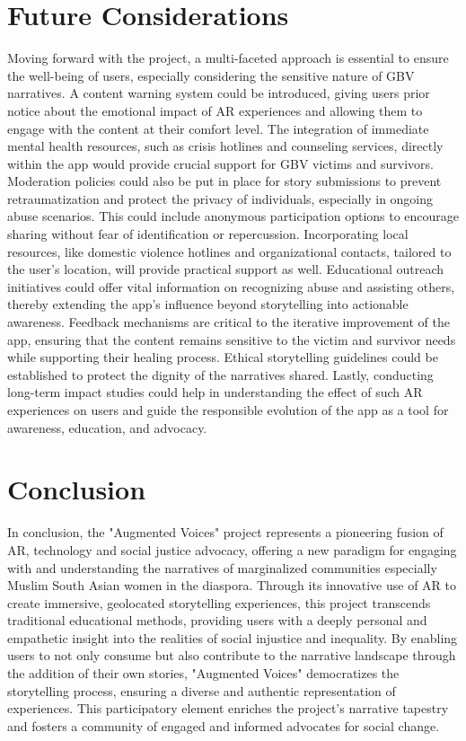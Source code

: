 \documentclass[manuscript,screen]{acmart}
\begin{document}
\section{ Future Considerations}
Moving forward with the project, a multi-faceted approach is essential to ensure the well-being of users, especially considering the sensitive nature of GBV narratives. A content warning system could be introduced, giving users prior notice about the emotional impact of AR experiences and allowing them to engage with the content at their comfort level. The integration of immediate mental health resources, such as crisis hotlines and counseling services, directly within the app would provide crucial support for GBV victims and survivors. Moderation policies could also be put in place for story submissions to prevent retraumatization and protect the privacy of individuals, especially in ongoing abuse scenarios. This could include anonymous participation options to encourage sharing without fear of identification or repercussion. Incorporating local resources, like domestic violence hotlines and organizational contacts, tailored to the user's location, will provide practical support as well. Educational outreach initiatives could offer vital information on recognizing abuse and assisting others, thereby extending the app's influence beyond storytelling into actionable awareness. Feedback mechanisms are critical to the iterative improvement of the app, ensuring that the content remains sensitive to the victim and survivor needs while supporting their healing process. Ethical storytelling guidelines could be established to protect the dignity of the narratives shared. Lastly, conducting long-term impact studies could help in understanding the effect of such AR experiences on users and guide the responsible evolution of the app as a tool for awareness, education, and advocacy.

\section{Conclusion}
In conclusion, the "Augmented Voices" project represents a pioneering fusion of AR, technology and social justice advocacy, offering a new paradigm for engaging with and understanding the narratives of marginalized communities especially Muslim South Asian women in the diaspora. Through its innovative use of AR to create immersive, geolocated storytelling experiences, this project transcends traditional educational methods, providing users with a deeply personal and empathetic insight into the realities of social injustice and inequality. By enabling users to not only consume but also contribute to the narrative landscape through the addition of their own stories, "Augmented Voices" democratizes the storytelling process, ensuring a diverse and authentic representation of experiences. This participatory element enriches the project's narrative tapestry and fosters a community of engaged and informed advocates for social change.
\end{document}
